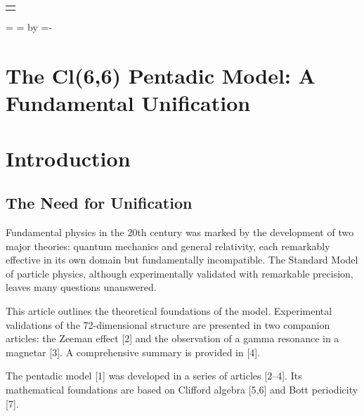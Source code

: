 \documentclass[11pt]{article}
\title{}
\author{}
\date{}
\makeatletter
\renewcommand{\maketitle}{
\begin{center}
\vspace*{1cm}
{\fontsize{18}{24}\selectfont \textbf{\@title} \par}
\vspace{1cm}
{\Large
\begin{tabular}[t]{c}
\@author
\end{tabular}\par}
\vspace{1cm}
{\Large \@date \par}
\end{center}
\vspace{1cm}
}
\makeatother
\begin{document}
\maketitle
\thispagestyle{firstpage}
\newlength{\abstractheight}
=\vbox{
}
\abstractheight=
\advance\abstractheight by 
\newlength{\remaining}
\remaining=\dimexpr\textheight - \pagetotal\relax
\ifdim\abstractheight > \remaining
\enlargethispage{\dimexpr\abstractheight - \remaining\relax}
\fi
\clearpage
\pagestyle{fancy}
\hypertarget{the-cl66-pentadic-model-a-fundamental-unification}{%
\section{The Cl(6,6) Pentadic Model: A Fundamental
Unification}\label{the-cl66-pentadic-model-a-fundamental-unification}}

\hypertarget{introduction}{%
\section{Introduction}\label{introduction}}

\hypertarget{the-need-for-unification}{%
\subsection{The Need for Unification}\label{the-need-for-unification}}

Fundamental physics in the 20th century was marked by the development of
two major theories: quantum mechanics and general relativity, each
remarkably effective in its own domain but fundamentally incompatible.
The Standard Model of particle physics, although experimentally
validated with remarkable precision, leaves many questions unanswered.

This article outlines the theoretical foundations of the model.
Experimental validations of the 72-dimensional structure are presented
in two companion articles: the Zeeman effect {[}2{]} and the observation
of a gamma resonance in a magnetar {[}3{]}. A comprehensive summary is
provided in {[}4{]}.

The pentadic model {[}1{]} was developed in a series of articles
{[}2--4{]}. Its mathematical foundations are based on Clifford algebra
{[}5,6{]} and Bott periodicity {[}7{]}.
\end{document}

